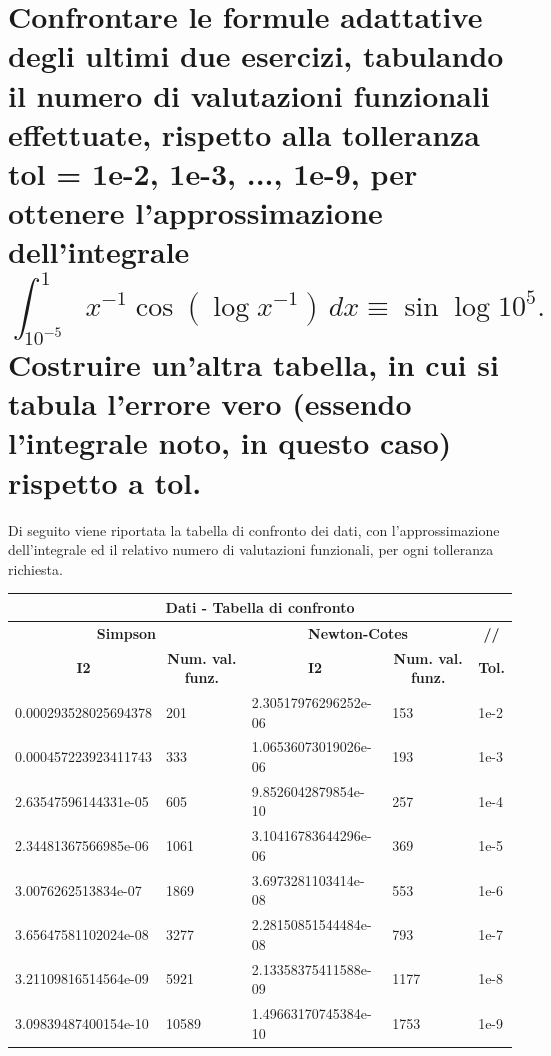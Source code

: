 \documentclass[10pt,a4paper]{article}
\begin{document}
\section{
  Confrontare le formule adattative degli ultimi due esercizi, tabulando il numero
  di valutazioni funzionali effettuate, rispetto alla tolleranza \textbf{tol = 1e-2, 1e-3, ..., 1e-9}, per
  ottenere l'approssimazione dell'integrale
  $$
    \int_{10^{-5}}^{1}
    x^{-1} \cos(\log x^{-1})
    \, dx \equiv \sin \log 10^5.
  $$
  Costruire un'altra tabella, in cui si tabula l'errore vero (essendo l'integrale noto, in questo caso)
  rispetto a \textbf{tol}.
 }
 Di seguito viene riportata la tabella di confronto dei dati, 
 con l'approssimazione dell'integrale ed il relativo numero di valutazioni funzionali, per ogni tolleranza richiesta. 

 \begin{center}
  \setlength\tabcolsep{2pt}
  \begin{tabular}{|p{3.6cm} | p{1cm} | p{3.6cm} | p{1cm} | p{1cm}|}
    \hline
    \multicolumn{5}{|c|}{\textbf{Dati - Tabella di confronto}}  \\                                                                                                                                 
    \hline
    \multicolumn{2}{|c|}{\textbf{Simpson}} & \multicolumn{2}{|c|}{\textbf{Newton-Cotes}} & \multicolumn{1}{c|}{\textbf{//}} \\                                                                           
    \hline
    \multicolumn{1}{|c|}{\textbf{I2}} & \multicolumn{1}{|c|}{\textbf{Num. val. funz.}} & \multicolumn{1}{|c|}{\textbf{I2}} &
     \multicolumn{1}{|c|}{\textbf{Num. val. funz.}}  & \multicolumn{1}{|c|}{\textbf{Tol.}} \\
    \hline
    0.000293528025694378 & 201 & 2.30517976296252e-06 & 153 & 1e-2 \\
    0.000457223923411743 & 333 & 1.06536073019026e-06 & 193 & 1e-3 \\
    2.63547596144331e-05 & 605 & 9.8526042879854e-10 & 257 & 1e-4 \\
    2.34481367566985e-06 & 1061 & 3.10416783644296e-06 & 369 & 1e-5 \\
    3.0076262513834e-07 & 1869 & 3.6973281103414e-08 & 553 & 1e-6 \\
    3.65647581102024e-08 & 3277 & 2.28150851544484e-08 & 793 & 1e-7 \\
    3.21109816514564e-09 & 5921 & 2.13358375411588e-09 & 1177 & 1e-8 \\
    3.09839487400154e-10 & 10589 & 1.49663170745384e-10 & 1753 & 1e-9 \\
    \hline
\end{tabular}
\end{center}
\end{document}
